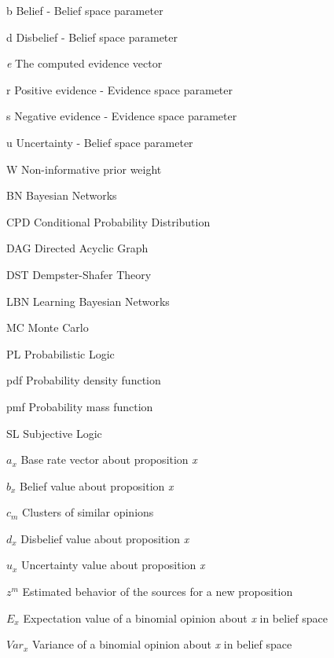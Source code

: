 \documentclass[a4,12pt]{ozu-thesis}
\begin{document}
\begin{preliminary}
\begin{abbrv}
\item[b]                    Belief - Belief space parameter
\item[d]                    Disbelief - Belief space parameter
\item[\textit{e}]                    The computed evidence vector
\item[r]                    Positive evidence - Evidence space parameter
\item[s]                    Negative evidence - Evidence space parameter
\item[u]                    Uncertainty - Belief space parameter
\item[W]                    Non-informative prior weight
\\
\item[BN]                   Bayesian Networks
\item[CPD]                  Conditional Probability Distribution
\item[DAG]                  Directed Acyclic Graph
\item[DST]                  Dempster-Shafer Theory
\item[LBN]                  Learning Bayesian Networks
\item[MC]                   Monte Carlo
\item[PL]                   Probabilistic Logic
\item[pdf]                  Probability density function
\item[pmf]                  Probability mass function
\item[SL]                   Subjective Logic
\\
\item[$a_{x}$]                     Base rate vector about proposition \textit{x}
\item[$b_{x}$]                     Belief value about proposition \textit{x}
\item[$c_{m}$]                     Clusters of similar opinions
\item[$d_{x}$]                     Disbelief value about proposition \textit{x}
\item[$u_{x}$]                     Uncertainty value about proposition \textit{x}
\item[$z^{m}$]                     Estimated behavior of the sources for a new proposition 
\item[$E_{x}$]                     Expectation value of a binomial opinion about \textit{x} in belief space
\item[$Var_{x}$]                   Variance of a binomial opinion about \textit{x} in belief space

\end{abbrv}
\end{preliminary}
\end{document}
